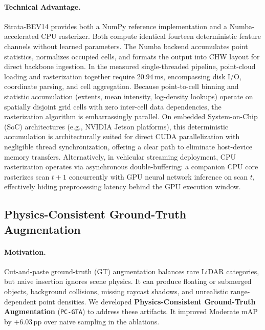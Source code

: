 \paragraph{Technical Advantage.}
Strata-BEV14 provides both a NumPy reference implementation and a Numba-accelerated CPU rasterizer. Both compute identical fourteen deterministic feature channels without learned parameters. The Numba backend accumulates point statistics, normalizes occupied cells, and formats the output into CHW layout for direct backbone ingestion. In the measured single-threaded pipeline, point-cloud loading and rasterization together require $20.94\,\text{ms}$, encompassing disk I/O, coordinate parsing, and cell aggregation. Because point-to-cell binning and statistic accumulation (extents, mean intensity, log-density lookups) operate on spatially disjoint grid cells with zero inter-cell data dependencies, the rasterization algorithm is embarrassingly parallel. On embedded System-on-Chip (SoC) architectures (e.g., NVIDIA Jetson platforms), this deterministic accumulation is architecturally suited for direct CUDA parallelization with negligible thread synchronization, offering a clear path to eliminate host-device memory transfers. Alternatively, in vehicular streaming deployment, CPU rasterization operates via asynchronous double-buffering: a companion CPU core rasterizes scan $t+1$ concurrently with GPU neural network inference on scan $t$, effectively hiding preprocessing latency behind the GPU execution window.

\subsection{Physics-Consistent Ground-Truth Augmentation}
\label{sec:pc_gta}

\paragraph{Motivation.}
Cut-and-paste ground-truth (GT) augmentation balances rare LiDAR categories, but naive insertion ignores scene physics. It can produce floating or submerged objects, background collisions, missing raycast shadows, and unrealistic range-dependent point densities. We developed \textbf{Physics-Consistent Ground-Truth Augmentation} (\texttt{PC-GTA}) to address these artifacts. It improved Moderate mAP by $+6.03\,\text{pp}$ over naive sampling in the ablations.

